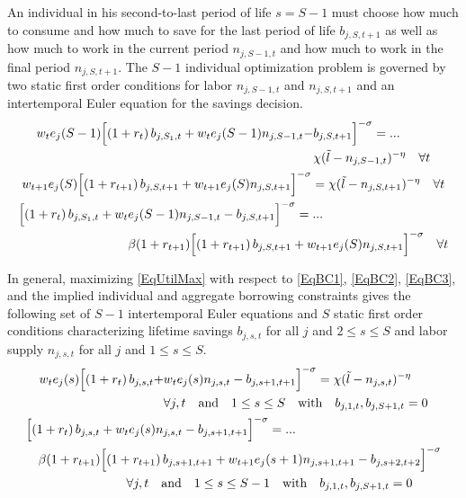 \documentclass[letterpaper,12pt]{article}
\theoremstyle{definition}
\begin{document}
\begin{spacing}{1.5}
    An individual in his second-to-last period of life $s=S-1$ must choose how much to consume and how much to save for the last period of life $b_{j,S,t+1}$ as well as how much to work in the current period $n_{j,S-1,t}$ and how much to work in the final period $n_{j,S,t+1}$. The $S-1$ individual optimization problem is governed by two static first order conditions for labor  $n_{j,S-1,t}$ and $n_{j,S,t+1}$ and an intertemporal Euler equation for the savings decision.
    \begin{gather}
      \begin{split}
        w_t e_j(S-1)\Bigl[\left(1+r_t\right)b_{j,S_1,t} + w_t e_j(S-1)n_{j,S-1,t} - &b_{j,S,t+1}\Bigr]^{-\sigma} = ... \\
        &\chi(\tilde{l} - n_{j,S-1,t})^{-\eta} \quad\forall t
      \end{split} \label{EqEulerSm1lab} \\
      w_{t+1} e_j(S)\Bigl[\left(1+r_{t+1}\right)b_{j,S,t+1} + w_{t+1} e_j(S)n_{j,S,t+1}\Bigr]^{-\sigma} = \chi(\tilde{l} - n_{j,S,t+1})^{-\eta} \quad\forall t \label{EqEulerSlab2} \\
      \begin{split}
        \Bigl[\left(1+r_t\right)b_{j,S_1,t} + w_t &e_j(S-1)n_{j,S-1,t} - b_{j,S,t+1}\Bigr]^{-\sigma} = ... \\
        &\beta(1+r_{t+1})\Bigl[\left(1+r_{t+1}\right)b_{j,S,t+1} + w_{t+1} e_j(S)n_{j,S,t+1}\Bigr]^{-\sigma} \quad\forall t
      \end{split} \label{EqEulerSm1Sav}
    \end{gather}

    In general, maximizing \eqref{EqUtilMax} with respect to \eqref{EqBC1}, \eqref{EqBC2}, \eqref{EqBC3}, and the implied individual and aggregate borrowing constraints gives the following set of $S-1$ intertemporal Euler equations and $S$ static first order conditions characterizing lifetime savings $b_{j,s,t}$ for all $j$ and $2\leq s\leq S$ and labor supply $n_{j,s,t}$ for all $j$ and $1\leq s\leq S$.
    \begin{gather}
      \begin{split}
        w_t e_j(s)\Bigl[\left(1+r_t\right)b_{j,s,t} + &w_t e_j(s)n_{j,s,t} - b_{j,s+1,t+1}\Bigr]^{-\sigma} = \chi(\tilde{l} - n_{j,s,t})^{-\eta} \\
        &\forall j,t \quad\text{and}\quad 1\leq s\leq S \quad\text{with}\quad b_{j,1,t},b_{j,S+1,t}=0
      \end{split} \label{EqEulerLabGen} \\
      \begin{split}
        &\Bigl[\left(1+r_t\right)b_{j,s,t} + w_t e_j(s)n_{j,s,t} - b_{j,s+1,t+1}\Bigr]^{-\sigma} = ... \\
        &\quad \beta(1+r_{t+1})\Bigl[\left(1+r_{t+1}\right)b_{j,s+1,t+1} + w_{t+1} e_j(s+1)n_{j,s+1,t+1} - b_{j,s+2,t+2}\Bigr]^{-\sigma} \\
        &\quad\quad\quad\quad\quad\quad\quad\quad\forall j,t \quad\text{and}\quad 1\leq s\leq S-1 \quad\text{with}\quad b_{j,1,t},b_{j,S+1,t}=0
      \end{split} \label{EqEulerSavGen}
    \end{gather}



\end{spacing}
\end{document}
